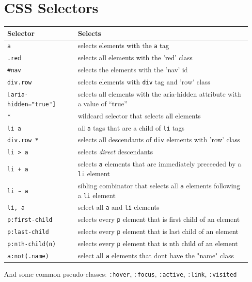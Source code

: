 \documentclass[11pt]{article}
\begin{document}
\section{CSS Selectors}
\label{sec:orgf26c57e}
\begin{center}
\begin{tabular}{ll}
Selector & Selects\\
\hline
\texttt{a} & selects elements with the \texttt{a} tag\\
\texttt{.red} & selects all elements with the 'red' class\\
\texttt{\#nav} & selects the elements with the 'nav' id\\
\texttt{div.row} & selects elements with \texttt{div} tag and 'row' class\\
\texttt{[aria-hidden="true"]} & selects all elements with the aria-hidden attribute with a value of “true”\\
\texttt{*} & wildcard selector that selects all elements\\
\texttt{li a} & all \texttt{a} tags that are a child of \texttt{li} tags\\
\texttt{div.row *} & selects all descendants of \texttt{div} elements with 'row' class\\
\texttt{li > a} & selects \emph{direct} descendants\\
\texttt{li + a} & selects \texttt{a} elements that are immediately preceeded by a \texttt{li} element\\
\texttt{li \textasciitilde{} a} & sibling combinator that selects all \texttt{a} elements following a \texttt{li} element\\
\texttt{li, a} & select all \texttt{a} and \texttt{li} elements\\
\texttt{p:first-child} & selects every \texttt{p} element that is first child of an element\\
\texttt{p:last-child} & selects every \texttt{p} element that is last child of an element\\
\texttt{p:nth-child(n)} & selects every \texttt{p} element that is nth child of an element\\
\texttt{a:not(.name)} & select all \texttt{a} elements that dont have the "name" class\\
\end{tabular}
\end{center}

And some common pseudo-classes: \texttt{:hover}, \texttt{:focus}, \texttt{:active}, \texttt{:link}, \texttt{:visited}
\end{document}
